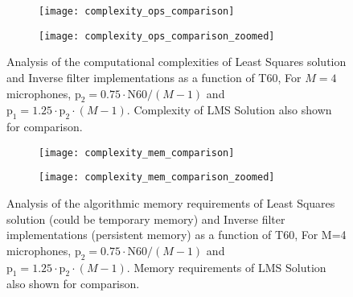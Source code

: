 \begin{figure}[H]
	\centering
	\begin{subfigure}[b]{0.45\textwidth}
		\centering
		\texttt{[image: complexity\_ops\_comparison]}
	\end{subfigure}
	\hfill
	\begin{subfigure}[b]{0.45\textwidth}
		\centering
		\texttt{[image: complexity\_ops\_comparison\_zoomed]}
	\end{subfigure}
	\caption[DAP algorithm complexity (cycles)]{Analysis of the computational complexities of Least Squares solution and Inverse filter implementations as a function of T60, For $M=4$ microphones, $\mathrm{p_2} = 0.75 \cdot \mathrm{N60}/(M-1)$ and $\mathrm{p_1} = 1.25 \cdot \mathrm{p_2} \cdot (M-1)$. Complexity of LMS Solution also shown for comparison.}
	\label{fig:complexity_operations}
\end{figure}

\begin{figure}[H]
	\centering
	\begin{subfigure}[b]{0.45\textwidth}
		\centering
		\texttt{[image: complexity\_mem\_comparison]}
	\end{subfigure}
	\hfill
	\begin{subfigure}[b]{0.45\textwidth}
		\centering
		\texttt{[image: complexity\_mem\_comparison\_zoomed]}
	\end{subfigure}
	\caption[DAP algorithm complexity (memory)]{Analysis of the algorithmic memory requirements  of Least Squares solution (could be temporary memory) and Inverse filter implementations (persistent memory) as a function of T60, For M=4 microphones, $\mathrm{p_2} = 0.75 \cdot \mathrm{N60}/(M-1)$ and $\mathrm{p_1} = 1.25 \cdot \mathrm{p_2} \cdot (M-1)$. Memory requirements of LMS Solution also shown for comparison.}
	\label{fig:complexity_memory}
\end{figure}


